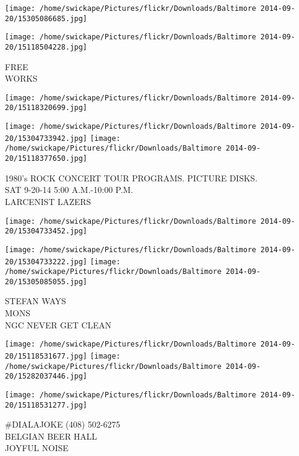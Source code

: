 \documentclass[10pt,letterpaper]{article}
\begin{document}
\texttt{[image: /home/swickape/Pictures/flickr/Downloads/Baltimore 2014-09-20/15305086685.jpg]}

\vspace{0.25in}
\texttt{[image: /home/swickape/Pictures/flickr/Downloads/Baltimore 2014-09-20/15118504228.jpg]}

FREE\\
WORKS\\
\pagebreak

\texttt{[image: /home/swickape/Pictures/flickr/Downloads/Baltimore 2014-09-20/15118320699.jpg]}

\vspace{0.25in}
\texttt{[image: /home/swickape/Pictures/flickr/Downloads/Baltimore 2014-09-20/15304733942.jpg]}
\texttt{[image: /home/swickape/Pictures/flickr/Downloads/Baltimore 2014-09-20/15118377650.jpg]}

1980's ROCK CONCERT TOUR PROGRAMS.  PICTURE DISKS.\\
SAT 9{-}20{-}14 5:00 A.M.{-}10:00 P.M.\\
LARCENIST LAZERS\\
\pagebreak

\texttt{[image: /home/swickape/Pictures/flickr/Downloads/Baltimore 2014-09-20/15304733452.jpg]}

\vspace{0.25in}
\texttt{[image: /home/swickape/Pictures/flickr/Downloads/Baltimore 2014-09-20/15304733222.jpg]}
\texttt{[image: /home/swickape/Pictures/flickr/Downloads/Baltimore 2014-09-20/15305085055.jpg]}

STEFAN WAYS\\
MONS\\
NGC NEVER GET CLEAN\\
\pagebreak

\texttt{[image: /home/swickape/Pictures/flickr/Downloads/Baltimore 2014-09-20/15118531677.jpg]}
\texttt{[image: /home/swickape/Pictures/flickr/Downloads/Baltimore 2014-09-20/15282037446.jpg]}

\texttt{[image: /home/swickape/Pictures/flickr/Downloads/Baltimore 2014-09-20/15118531277.jpg]}

\#DIALAJOKE (408) 502{-}6275\\
BELGIAN BEER HALL\\
JOYFUL NOISE\\
\pagebreak
\end{document}
